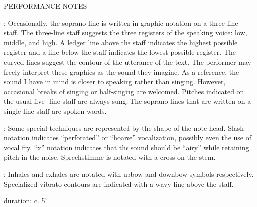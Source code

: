 \documentclass[11pt]{article}
\begin{document}
\begin{center}
\huge PERFORMANCE NOTES
\end{center}
\begingroup
\begin{center}

 : Occasionally, the soprano line is written in graphic notation on a three-line staff. The three-line staff suggests the three registers of the speaking voice: low, middle, and high. A ledger line above the staff indicates the highest possible register and a line below the staff indicates the lowest possible register. The curved lines suggest the contour of the utterance of the text. The performer may freely interpret these graphics as the sound they imagine. As a reference, the sound I have in mind is closer to speaking rather than singing. However, occasional breaks of singing or half-singing are welcomed. Pitches indicated on the usual five- line staff are always sung. The soprano lines that are written on a single-line staff are spoken words.
\rightskip\leftskip
\phantom{text} \hfill \phantom{()}

 : Some special techniques are represented by the shape of the note head. Slash notation indicates ``perforated'' or ``hoarse'' vocalization, possibly even the use of vocal fry. ``x'' notation indicates that the sound should be ``airy'' while retaining pitch in the noise. Sprechstimme is notated with a cross on the stem.
\rightskip\leftskip
\phantom{text} \hfill \phantom{()}

 : Inhales and exhales are notated with upbow and downbow symbols respectively. Specialized vibrato contours are indicated with a wavy line above the staff.
\rightskip\leftskip
\phantom{text} \hfill \phantom{()}


\end{center}
\endgroup

\vspace*{9\baselineskip}


\vspace*{26\baselineskip}

\begin{center}
duration: c. 5'
\end{center}
\end{document}
